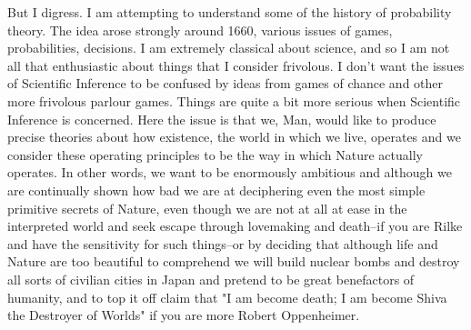 \documentclass{amsart}
\begin{document}
But I digress.  I am attempting to understand some of the history of probability theory.  The idea arose strongly around 1660, various issues of games, probabilities, decisions.  I am extremely classical about science, and so I am not all that enthusiastic about things that I consider frivolous.  I don't want the issues of Scientific Inference to be confused by ideas from games of chance and other more frivolous parlour games.  Things are quite a bit more serious when Scientific Inference is concerned.  Here the issue is that we, Man, would like to produce precise theories about how existence, the world in which we live, operates and we consider these operating principles to be the way in which Nature actually operates.  In other words, we want to be enormously ambitious and although we are continually shown how bad we are at deciphering even the most simple primitive secrets of Nature, even though we are not at all at ease in the interpreted world and seek escape through lovemaking and death--if you are Rilke and have the sensitivity for such things--or by deciding that although life and Nature are too beautiful to comprehend we will build nuclear bombs and destroy all sorts of civilian cities in Japan and pretend to be great benefactors of humanity, and to top it off claim that "I am become death; I am become Shiva the Destroyer of Worlds" if you are more Robert Oppenheimer.
\end{document}

